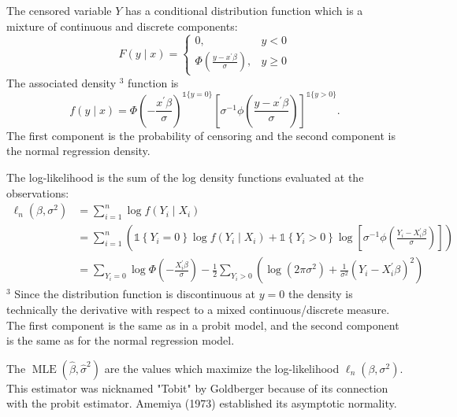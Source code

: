 \documentclass[10pt]{article}
\begin{document}
The censored variable $Y$ has a conditional distribution function which is a mixture of continuous and discrete components:
$$
F(y \mid x)=\left\{\begin{array}{cc}
0, & y<0 \\
\Phi\left(\frac{y-x^{\prime} \beta}{\sigma}\right), & y \geq 0
\end{array}\right.
$$
The associated density ${ }^{3}$ function is
$$
f(y \mid x)=\Phi\left(-\frac{x^{\prime} \beta}{\sigma}\right)^{\mathbb{1}\{y=0\}}\left[\sigma^{-1} \phi\left(\frac{y-x^{\prime} \beta}{\sigma}\right)\right]^{\mathbb{1}\{y>0\}} .
$$
The first component is the probability of censoring and the second component is the normal regression density.

The log-likelihood is the sum of the log density functions evaluated at the observations:
$$
\begin{aligned}
\ell_{n}\left(\beta, \sigma^{2}\right) &=\sum_{i=1}^{n} \log f\left(Y_{i} \mid X_{i}\right) \\
&=\sum_{i=1}^{n}\left(\mathbb{1}\left\{Y_{i}=0\right\} \log f\left(Y_{i} \mid X_{i}\right)+\mathbb{1}\left\{Y_{i}>0\right\} \log \left[\sigma^{-1} \phi\left(\frac{Y_{i}-X_{i}^{\prime} \beta}{\sigma}\right)\right]\right) \\
&=\sum_{Y_{i}=0} \log \Phi\left(-\frac{X_{i}^{\prime} \beta}{\sigma}\right)-\frac{1}{2} \sum_{Y_{i}>0}\left(\log \left(2 \pi \sigma^{2}\right)+\frac{1}{\sigma^{2}}\left(Y_{i}-X_{i}^{\prime} \beta\right)^{2}\right)
\end{aligned}
$$
${ }^{3}$ Since the distribution function is discontinuous at $y=0$ the density is technically the derivative with respect to a mixed continuous/discrete measure. The first component is the same as in a probit model, and the second component is the same as for the normal regression model.

The $\operatorname{MLE}\left(\widehat{\beta}, \widehat{\sigma}^{2}\right)$ are the values which maximize the log-likelihood $\ell_{n}\left(\beta, \sigma^{2}\right)$. This estimator was nicknamed "Tobit" by Goldberger because of its connection with the probit estimator. Amemiya (1973) established its asymptotic normality.
\end{document}
